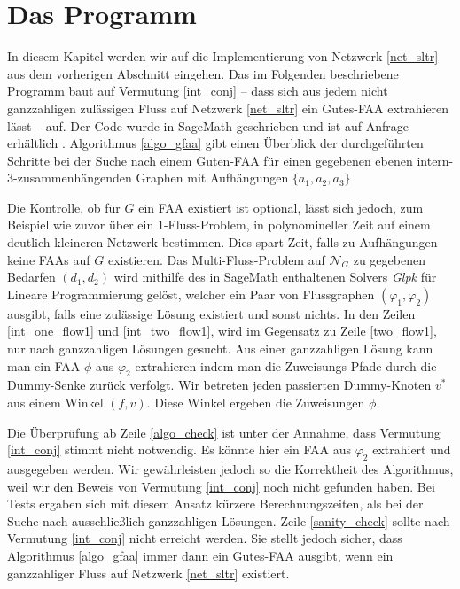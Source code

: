 \chapter{Das Programm}\label{the_program}

In diesem Kapitel werden wir auf die Implementierung von Netzwerk \ref{net_sltr} aus dem vorherigen Abschnitt eingehen. Das im Folgenden beschriebene Programm baut auf Vermutung \ref{int_conj} -- dass sich aus jedem nicht ganzzahligen zulässigen Fluss auf Netzwerk \ref{net_sltr} ein Gutes-FAA extrahieren lässt -- auf. Der Code wurde in SageMath geschrieben und ist auf Anfrage erhältlich \cite{sage}. Algorithmus \ref{algo_gfaa} gibt einen Überblick der durchgeführten Schritte bei der Suche nach einem Guten-FAA für einen gegebenen ebenen intern-3-zusammenhängenden Graphen mit Aufhängungen $\{a_1,a_2,a_3\}$



Die Kontrolle, ob für $G$ ein FAA existiert ist optional, lässt sich jedoch, zum Beispiel wie zuvor über ein 1-Fluss-Problem, in polynomineller Zeit auf einem deutlich kleineren Netzwerk bestimmen. Dies spart Zeit, falls zu Aufhängungen keine FAAs auf $G$ existieren. Das Multi-Fluss-Problem auf $\mathcal{N}_G$ zu gegebenen Bedarfen $(d_1,d_2)$ wird mithilfe des in SageMath enthaltenen Solvers \textit{Glpk} für Lineare Programmierung gelöst, welcher ein Paar von Flussgraphen $(\varphi_1,\varphi_2)$ ausgibt, falls eine zulässige Lösung existiert und sonst nichts\cite{glpk,sage}. In den Zeilen \ref{int_one_flow1} und \ref{int_two_flow1}, wird im Gegensatz zu Zeile \ref{two_flow1}, nur nach ganzzahligen Lösungen gesucht. Aus einer ganzzahligen Lösung kann man ein FAA $\phi$ aus $\varphi_2$ extrahieren indem man die Zuweisungs-Pfade durch die Dummy-Senke zurück verfolgt. Wir betreten jeden passierten Dummy-Knoten $v^*$ aus einem Winkel $(f,v)$. Diese Winkel ergeben die Zuweisungen $\phi$.

Die Überprüfung ab Zeile \ref{algo_check} ist unter der Annahme, dass Vermutung \ref{int_conj} stimmt nicht notwendig. Es könnte hier ein FAA aus $\varphi_2$ extrahiert und ausgegeben werden. Wir gewährleisten  jedoch so die Korrektheit des Algorithmus, weil wir den Beweis von Vermutung \ref{int_conj} noch nicht gefunden haben. Bei Tests ergaben sich mit diesem Ansatz kürzere Berechnungszeiten, als bei der Suche nach ausschließlich ganzzahligen Lösungen. Zeile \ref{sanity_check} sollte nach Vermutung \ref{int_conj} nicht erreicht werden. Sie stellt jedoch sicher, dass Algorithmus \ref{algo_gfaa} immer dann ein Gutes-FAA ausgibt, wenn ein ganzzahliger Fluss auf Netzwerk \ref{net_sltr} existiert.

